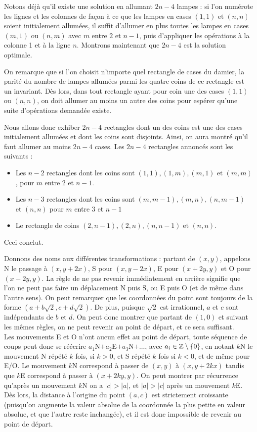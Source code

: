 \begin{sol}
Notons déjà qu'il existe une solution en allumant $2n-4$ lampes : si l'on numérote les lignes et les colonnes de façon à ce que les lampes en cases $(1,1)$ et $(n,n)$ soient initialement allumées, il suffit d'allumer en plus toutes les lampes en cases $(m,1)$ ou $(n,m)$ avec $m$ entre $2$ et $n-1$, puis d'appliquer les opérations à la colonne 1 et à la ligne $n$. Montrons maintenant que $2n-4$ est la solution optimale.\par
On remarque que si l'on choisit n'importe quel rectangle de cases du damier, la parité du nombre de lampes allumées parmi les quatre coins de ce rectangle est un invariant. Dès lors, dans tout rectangle ayant pour coin une des cases $(1,1)$ ou $(n,n)$, on doit allumer au moins un autre des coins pour espérer qu'une suite d'opérations demandée existe.\par
Nous allons donc exhiber $2n-4$ rectangles dont un des coins est une des cases initialement allumées et dont les coins sont disjoints. Ainsi, on aura montré qu'il faut allumer au moins $2n-4$ cases. Les $2n-4$ rectangles annoncés sont les suivants :
\begin{itemize}
\item Les $n-2$ rectangles dont les coins sont $(1,1), (1,m), (m,1)$ et $(m,m)$, pour $m$ entre 2 et $n-1$.
\item Les $n-3$ rectangles dont les coins sont $(m,m-1), (m,n),(n,m-1)$ et $(n,n)$ pour $m$ entre 3 et $n-1$
\item Le rectangle de coins $(2,n-1), (2,n), (n,n-1)$ et $(n,n)$.
\end{itemize}
Ceci conclut.
\end{sol}


\begin{sol}
Donnons des noms aux différentes transformations : partant de $(x,y)$, appelons N le passage à $(x,y+2x)$, S pour $(x,y-2x)$, E pour $(x+2y,y)$ et O pour $(x-2y,y)$. La règle de ne pas revenir immédiatement en arrière signifie que l'on ne peut pas faire un déplacement N puis S, ou E puis O (et de même dans l'autre sens). On peut remarquer que les coordonnées du point sont toujours de la forme $(a+b\sqrt2,c+d\sqrt2)$. De plus, puisque $\sqrt2$ est irrationnel, $a$ et $c$ sont indépendants de $b$ et $d$. On peut donc montrer que partant de $(1,0)$ et suivant les mêmes règles, on ne peut revenir au point de départ, et ce sera suffisant.\\
Les mouvements E et O n'ont aucun effet au point de départ, toute séquence de coups peut donc se réécrire $a_1$N$+a_2$E$+a_3$N$+\ldots$, avec $a_i\in\mathbb Z\setminus\{0\}$, en notant $k$N le mouvement N répété $k$ fois, si $k>0$, et S répété $k$ fois si $k<0$, et de même pour E/O. Le mouvement $k$N correspond à passer de $(x,y)$ à $(x,y+2kx)$ tandis que $k$E correspond à passer à $(x+2ky,y)$. On peut montrer par récurrence qu'après un mouvement $k$N on a $|c|>|a|$, et $|a|>|c|$ après un mouvement $k$E. Dès lors, la distance à l'origine du point $(a,c)$ est strictement croissante (puisqu'on augmente la valeur absolue de la coordonnée la plus petite en valeur absolue, et que l'autre reste inchangée), et il est donc impossible de revenir au point de départ.
\end{sol}


